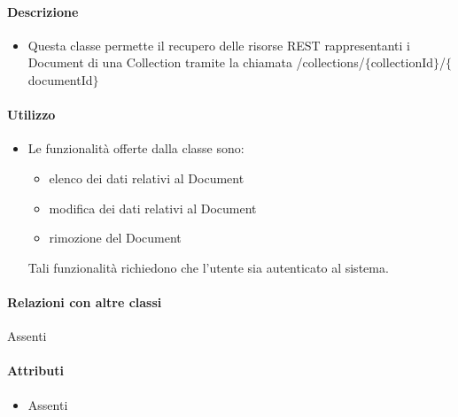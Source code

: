\paragraph*{Descrizione}
\begin{itemize}
\item[] Questa classe permette il recupero delle risorse REST rappresentanti i Document di una Collection tramite la chiamata /collections/$\{$collectionId$\}$/$\{$documentId$\}$
\end{itemize}

\paragraph*{Utilizzo}
\begin{itemize}
\item[] Le funzionalità offerte dalla classe sono: 
\begin{itemize} 
\item elenco dei dati relativi al Document 
\item modifica dei dati relativi al Document
\item rimozione del Document 
\end{itemize} 
Tali funzionalità richiedono che l'utente sia autenticato al sistema.
\end{itemize}

\paragraph*{Relazioni con altre classi}
Assenti

\paragraph*{Attributi}
\begin{itemize}
\item[] Assenti
\end{itemize}

